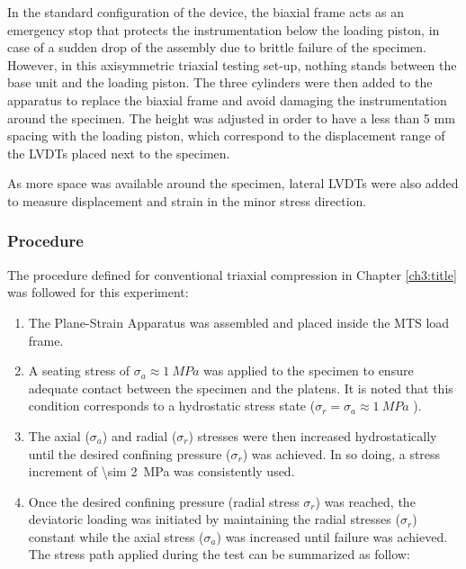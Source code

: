 In the standard configuration of the device, the biaxial frame acts as an emergency stop that protects the instrumentation below the loading piston, in case of a sudden drop of the assembly due to brittle failure of the specimen. However, in this axisymmetric triaxial testing set-up, nothing stands between the base unit and the loading piston. The three cylinders were then added to the apparatus to replace the biaxial frame and avoid damaging the instrumentation around the specimen. The height was adjusted in order to have a less than 5 \si{\milli\meter} spacing with the loading piston, which correspond to the displacement range of the LVDTs placed next to the specimen. 

As more space was available around the specimen, lateral LVDTs were also added to measure displacement and strain in the minor stress direction. 

\subsubsection{Procedure}

The procedure defined for conventional triaxial compression in Chapter \ref{ch3:title} was followed for this experiment:  

\begin{enumerate}
    \item The Plane-Strain Apparatus was assembled and placed inside the MTS load frame.

    \item  A seating stress of $\sigma_a \approx \SI{1}{MPa}$ was applied to the specimen to ensure adequate contact between the specimen and the platens. It is noted that this condition corresponds to a hydrostatic stress state ($\sigma_r = \sigma_a \approx \SI{1}{MPa}$ ).

    \item  The axial ($\sigma_a$) and radial ($\sigma_r$) stresses were then increased hydrostatically until the desired confining pressure ($\sigma_r$) was achieved. In so doing, a stress increment of \SI{\sim 2}{MPa} was consistently used.

    \item  Once the desired confining pressure (radial stress $\sigma_r$) was reached, the deviatoric loading was initiated by maintaining the radial stresses ($\sigma_r$) constant while the axial stress ($\sigma_a$) was increased until failure was achieved. The stress path applied during the test can be summarized as follow:
\end{enumerate}

